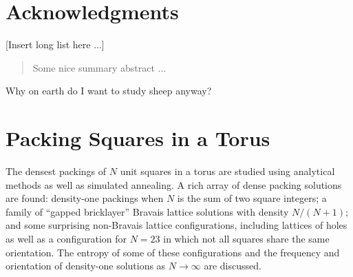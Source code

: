 \documentclass{umthesis}          %
\begin{document}
\begin{dedication}              %
  \begin{center}
    \emph{}
  \end{center}
\end{dedication}


\chapter{Acknowledgments}             %
  [Insert long list here ...]

\begin{abstract}                %
 Some nice summary abstract ...
\end{abstract}



\tableofcontents                %
\listoftables                   %
\listoffigures                  %


\mainmatter   %

Why on earth do I want to study sheep anyway?

\chapter{Packing Squares in a Torus}
The densest packings of $N$ unit squares in a torus are studied using analytical methods as well as simulated annealing.  A rich array of dense packing solutions are found: density-one packings when $N$ is the sum of two square integers; a family of ``gapped bricklayer'' Bravais lattice solutions with density $N/(N+1)$; and some surprising non-Bravais lattice configurations, including lattices of holes as well as a configuration for $N=23$ in which not all squares share the same orientation.  The entropy of some of these configurations and the frequency and orientation of density-one solutions as $N \rightarrow \infty$ are discussed.
\end{document}
